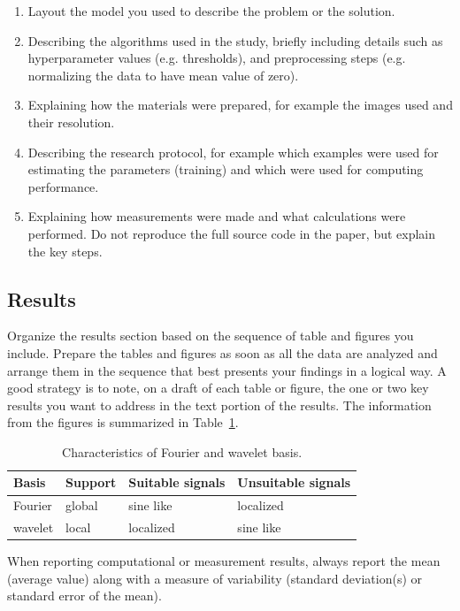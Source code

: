 \documentclass[10pt,conference,compsocconf]{IEEEtran}
\begin{document}
\begin{enumerate}
\item Layout the model you used to describe the problem or the solution.
\item Describing the algorithms used in the study, briefly including
  details such as hyperparameter values (e.g. thresholds), and
  preprocessing steps (e.g. normalizing the data to have mean value of
  zero).
\item Explaining how the materials were prepared, for example the
  images used and their resolution.
\item Describing the research protocol, for example which examples
  were used for estimating the parameters (training) and which were
  used for computing performance.
\item Explaining how measurements were made and what
  calculations were performed. Do not reproduce the full source code in
  the paper, but explain the key steps.
\end{enumerate}

\subsection{Results}

Organize the results section based on the sequence of table and
figures you include. Prepare the tables and figures as soon as all
the data are analyzed and arrange them in the sequence that best
presents your findings in a logical way. A good strategy is to note,
on a draft of each table or figure, the one or two key results you
want to address in the text portion of the results.
The information from the figures is
summarized in Table~\ref{tab:fourier-wavelet}.

\begin{table}[htbp]
  \centering
  \begin{tabular}[c]{|l||l|l|l|}
    \hline
    Basis&Support&Suitable signals&Unsuitable signals\\
    \hline
    Fourier&global&sine like&localized\\
    wavelet&local&localized&sine like\\
    \hline
  \end{tabular}
  \caption{Characteristics of Fourier and wavelet basis.}
  \label{tab:fourier-wavelet}
\end{table}

When reporting computational or measurement results, always
report the mean (average value) along with a measure of variability
(standard deviation(s) or standard error of the mean).
\end{document}
